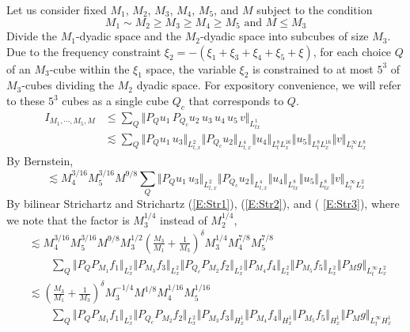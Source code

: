 \documentclass[12pt,letterpaper,leqno]{amsart}
\theoremstyle{plain}
\numberwithin{equation}{section}
\numberwithin{theorem}{section}
\numberwithin{proposition}{section}
\numberwithin{lemma}{section}
\numberwithin{corollary}{section}
\begin{document}
Let us consider fixed $M_{1}$, $M_{2}$, $M_{3}$, $M_{4}$, $M_{5}$, and $M$
subject to the condition 
\begin{equation*}
M_{1}\sim M_{2}\geq M_{3}\geq M_{4}\geq M_{5}\text{ and }M\leq M_{3}
\end{equation*}%
Divide the $M_{1}$-dyadic space and the $M_{2}$-dyadic space into subcubes
of size $M_{3}$. Due to the frequency constraint $\xi _{2}=-(\xi _{1}+\xi
_{3}+\xi _{4}+\xi _{5}+\xi )$, for each choice $Q$ of an $M_{3}$-cube within
the $\xi _{1}$ space, the variable $\xi _{2}$ is constrained to at most $%
5^{3}$ of $M_{3}$-cubes dividing the $M_{2}$ dyadic space. For expository
convenience, we will refer to these $5^{3}$ cubes as a single cube $Q_{c}$
that corresponds to $Q$. 
\begin{align*}
I_{M_{1},\cdots ,M_{5},M}& \leq \sum_{Q}\Vert
P_{Q}u_{1}\,P_{Q_{c}}u_{2}\,u_{3}\,u_{4}\,u_{5}\,v\Vert _{L_{tx}^{1}} \\
& \lesssim \sum_{Q}\Vert P_{Q}u_{1}\,u_{3}\Vert _{L_{t,x}^{2}}\Vert
P_{Q_{c}}u_{2}\Vert _{L_{t,x}^{4}}\Vert u_{4}\Vert
_{L_{t}^{8}L_{x}^{16}}\Vert u_{5}\Vert _{L_{t}^{8}L_{x}^{16}}\Vert v\Vert
_{L_{t}^{\infty }L_{x}^{8}}
\end{align*}%
By Bernstein, 
\begin{equation*}
\lesssim M_{4}^{3/16}M_{5}^{3/16}M^{9/8}\sum_{Q}\Vert P_{Q}u_{1}\,u_{3}\Vert
_{L_{t,x}^{2}}\Vert P_{Q_{c}}u_{2}\Vert _{L_{t,x}^{4}}\Vert u_{4}\Vert
_{L_{tx}^{8}}\Vert u_{5}\Vert _{L_{tx}^{8}}\Vert v\Vert _{L_{t}^{\infty
}L_{x}^{2}}
\end{equation*}%
By bilinear Strichartz and Strichartz (\ref{E:Str1}), (\ref{E:Str2}), and (%
\ref{E:Str3}), where we note that the factor is $M_{3}^{1/4}$ instead of $%
M_{2}^{1/4}$, 
\begin{align*}
& \lesssim M_{4}^{3/16}M_{5}^{3/16}M^{9/8}M_{3}^{1/2}(\frac{M_{3}}{M_{1}}+%
\frac{1}{M_{3}})^{\delta }M_{3}^{1/4}M_{4}^{7/8}M_{5}^{7/8} \\
& \qquad \sum_{Q}\Vert P_{Q}P_{M_{1}}f_{1}\Vert _{L_{x}^{2}}\Vert
P_{M_{3}}f_{3}\Vert _{L_{x}^{2}}\Vert P_{Q_{c}}P_{M_{2}}f_{2}\Vert
_{L_{x}^{2}}\Vert P_{M_{4}}f_{4}\Vert _{L_{x}^{2}}\Vert P_{M_{5}}f_{5}\Vert
_{L_{x}^{2}}\Vert P_{M}g\Vert _{L_{t}^{\infty }L_{x}^{2}} \\
& \lesssim (\frac{M_{3}}{M_{1}}+\frac{1}{M_{3}})^{\delta
}M_{3}^{-1/4}M^{1/8}M_{4}^{1/16}M_{5}^{1/16} \\
& \qquad \sum_{Q}\Vert P_{Q}P_{M_{1}}f_{1}\Vert _{L_{x}^{2}}\Vert
P_{Q_{c}}P_{M_{2}}f_{2}\Vert _{L_{x}^{2}}\Vert P_{M_{3}}f_{3}\Vert
_{H_{x}^{1}}\Vert P_{M_{4}}f_{4}\Vert _{H_{x}^{1}}\Vert P_{M_{5}}f_{5}\Vert
_{H_{x}^{1}}\Vert P_{M}g\Vert _{L_{t}^{\infty }H_{x}^{1}}
\end{align*}%
\end{document}
